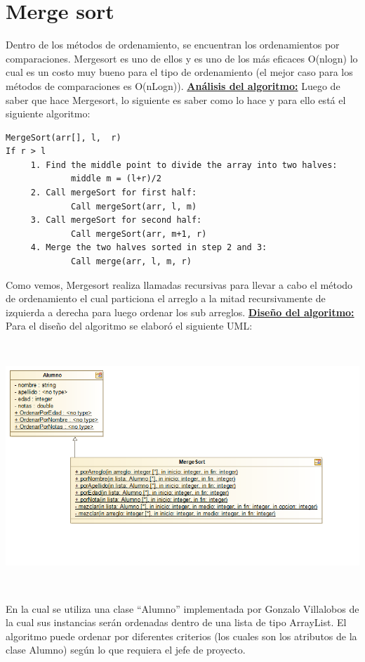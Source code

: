 \documentclass[12pt,letterpaper]{article}
\begin{document}
\section{Merge sort}
\vskip 0.4cm
Dentro de los métodos de ordenamiento, se encuentran los ordenamientos por comparaciones. Mergesort es uno de ellos y es uno de los más eficaces O(nlogn) lo cual es un costo muy bueno para el tipo de ordenamiento (el mejor caso para los métodos de comparaciones es O(nLogn)).
\vskip 0.4cm
{\bf\underline {Análisis del algoritmo:}} Luego de saber que hace Mergesort, lo siguiente es saber como lo hace y para ello está el siguiente algoritmo:
\vskip 0.4cm
\begin{lstlisting}
MergeSort(arr[], l,  r)
If r > l
     1. Find the middle point to divide the array into two halves:  
             middle m = (l+r)/2
     2. Call mergeSort for first half:   
             Call mergeSort(arr, l, m)
     3. Call mergeSort for second half:
             Call mergeSort(arr, m+1, r)
     4. Merge the two halves sorted in step 2 and 3:
             Call merge(arr, l, m, r)
\end{lstlisting}
\vskip 0.4cm
Como vemos, Mergesort realiza llamadas recursivas para llevar a cabo el método de ordenamiento el cual particiona el arreglo a la mitad recursivamente de izquierda a derecha para luego ordenar los sub arreglos.
\vskip 0.4cm
\newpage
{\bf\underline {Diseño del algoritmo:}}
\vskip 0.4cm
Para el diseño del algoritmo se elaboró el siguiente UML:
\vskip 0.2cm
\includegraphics[width=15cm,height=10cm]{Imagen6} 
\vskip 0.4cm
En la cual se utiliza una clase “Alumno” implementada por Gonzalo Villalobos de la cual sus instancias serán ordenadas dentro de una lista de tipo ArrayList. El algoritmo puede ordenar por diferentes criterios (los cuales son los atributos de la clase Alumno) según lo que requiera el jefe de proyecto.
\vskip 0.4cm
\newpage
\end{document}

